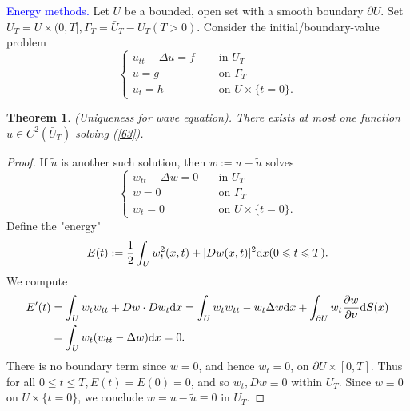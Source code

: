 \documentclass[hyperref,UTF8,12pt]{article}
\numberwithin{equation}{subsection}
\theoremstyle{plain}
\newtheorem{theorem}{Theorem}
\theoremstyle{definition}
\numberwithin{theorem}{section}
\numberwithin{lemma}{section}
\numberwithin{proposition}{section}
\numberwithin{remark}{section}
\numberwithin{corollary}{section}
\numberwithin{definition}{section}
\numberwithin{problem}{section}
\numberwithin{example}{section}
\def\dif{\textup{d}}
\newcommand{\ptl}{\partial}
\renewcommand{\leq}{\leqslant}
\begin{document}
\noindent\textcolor{blue}{Energy methods.} Let $U$ be a bounded, open set with a smooth boundary $\ptl U$. Set $U_T=U\times(0,T],\Gamma_T=\bar{U}_T-U_T(T>0)$. Consider the initial/boundary-value problem\[\left\{\begin{aligned}
	u_{tt}-\Delta u=f&\quad\text{ in } U_T\\
	u=g&\quad\text{ on } \Gamma_T\\
	u_t=h&\quad\text{ on } U\times\{t=0\}.
\end{aligned}\right.\tag{63}\label{63}\]
\begin{theorem}
(Uniqueness for wave equation). There exists at most one function $u\in C^2(\bar{U}_T)$ solving \textup{(\ref{63})}.
\end{theorem}
\begin{proof}
If $\tilde{u}$ is another such solution, then $w:=u-\tilde{u}$ solves\[\left\{\begin{aligned}
	w_{tt}-\Delta w=0 &\quad\text{in } U_T\\
	w=0&\quad\text{on } \Gamma_T\\
	w_t=0&\quad\text{on } U \times\{t=0\}.
\end{aligned}\right.\]Define the "energy"
\[E(t):=\frac{1}{2}\int_Uw_t^2(x,t)+|Dw(x,t)|^2\dif x(0\leq t\leq T).\]We compute 
\[\begin{aligned}
	E^\prime(t)&=\int_Uw_tw_{tt}+Dw\cdot Dw_t\dif x=\int_Uw_tw_{tt}-w_t\Delta w\dif x+\int_{\ptl U}w_t\frac{\ptl w}{\ptl\nu}\dif S(x)\\
	&=\int_Uw_t(w_{tt}-\Delta w)\dif x=0.
\end{aligned}\]There is no boundary term since $w=0$, and hence $w_t=0$, on $\ptl U \times[0,T]$. Thus for all $0\leq t\leq T,E(t)=E(0)=0$, and so $w_t,Dw\equiv0$ within $U_T$. Since $w\equiv0$ on $U\times\{t=0\}$, we conclude $w=u-\tilde{u}\equiv0$ in $U_T$.
\end{proof}
\end{document}

